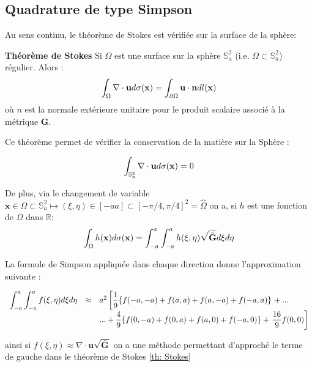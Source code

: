 \subsection{Quadrature de type Simpson}

Au sens continu, le théorème de Stokes est vérifiée sur la surface de la sphère:

\begin{theoreme}
\textbf{Théorème de Stokes}
Si $\Omega$ est une surface sur la sphère $\mathbb{S}_a^2$ (i.e. $\Omega \subset \mathbb{S}_a^2$) régulier. Alors :
\begin{equation}
\displaystyle\int_\Omega \nabla \cdot \mathbf{u} d \sigma (\mathbf{x}) = \displaystyle\int_{\partial \Omega} \mathbf{u} \cdot \mathbf{n} dl(\mathbf{x})
\end{equation}
où $n$ est la normale extérieure unitaire pour le produit scalaire associé à la métrique $\mathbf{G}$.
\label{th: Stokes}
\end{theoreme}

Ce théorème permet de vérifier la conservation de la matière sur la Sphère :

\begin{equation}
\displaystyle\int_{\mathbb{S}_a^2}\nabla \cdot \mathbf{u} d \sigma (\mathbf{x}) = 0
\label{eq: Stokes global}
\end{equation}

De plus, via le changement de variable $\mathbf{x} \in \Omega \subset \mathbb{S}_a^2 \mapsto (\xi, \eta) \in [-a a] \subset [- \pi/4, \pi/4]^2 = \hat{\Omega}$ on a, si $h$ est une fonction de $\Omega$ dans $\mathbb{R}$:
\begin{equation}
\displaystyle\int_{\Omega} h(\mathbf{x}) d \sigma ( \mathbf{x} ) = \displaystyle\int_{-a}^a \displaystyle\int_{-a}^a h(\xi, \eta) \sqrt{\bar{\mathbf{G}}}d\xi d\eta
\end{equation}

La formule de Simpson appliquée dans chaque direction donne l'approximation suivante :

\begin{equation}
\begin{array}{rcl}
\displaystyle\int_{-a}^a \displaystyle\int_{-a}^a f(\xi, \eta)d\xi d\eta & \approx & a^2 \left[ \dfrac{1}{9} \lbrace  f(-a,-a) + f(a,a) + f(a,-a) + f(-a,a) \rbrace \right. + ...\\
& & ...+ \dfrac{4}{9} \lbrace  f(0,-a) + f(0,a) + f(a,0) + f(-a,0) \rbrace +  \left. \dfrac{16}{9} f(0,0) \right]
\end{array}
\end{equation}

ainsi si $f(\xi, \eta) \approx \nabla \cdot \mathbf{u} \sqrt{\bar{\mathbf{G}}}$ on a une méthode permettant d'approché le terme de gauche dans le théorème de Stokes \ref{th: Stokes}


